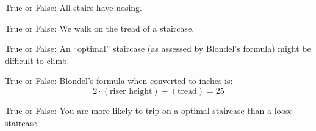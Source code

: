 \documentclass[noauthor,nooutcomes]{ximera}
\author{Claire Merriman and Bart Snapp}
\begin{document}
\maketitle



\begin{exercise}
  True or False: All stairs have nosing.
\end{exercise}


\begin{exercise}
   True or False: We walk on the tread of a staircase.
\end{exercise}


\begin{exercise} True or False: 
  An ``optimal'' staircase (as assessed by Blondel's formula) might be difficult to climb.
\end{exercise}

\begin{exercise} True or False: 
  Blondel's formula when converted to inches is:
  \[
  2\cdot (\text{riser height}) + (\text{tread})=25 
  \]
\end{exercise}

\begin{exercise} True or False: 
  You are more likely to trip on a optimal staircase than a loose
  staircase.
\end{exercise}

\end{document}
